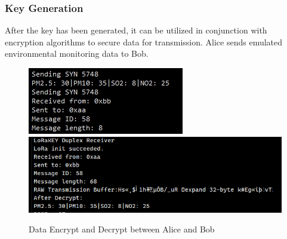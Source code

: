 \documentclass{beamer}
\begin{document}
\begin{frame}
  \frametitle{Key Generation}
  After the key has been generated, it can be utilized in conjunction with encryption algorithms to secure data for transmission. Alice sends emulated environmental monitoring data to Bob.

  \begin{figure}
    \centering
    {\includegraphics[width=0.38\linewidth]{../figures/chachaalice.png}}
    {\includegraphics[width=0.6\linewidth]{../figures/chachabob.png}}
    \caption{Data Encrypt and Decrypt between Alice and Bob}\label{Data Encrypt and Decrypt}
  \end{figure}
\end{frame}
\end{document}
